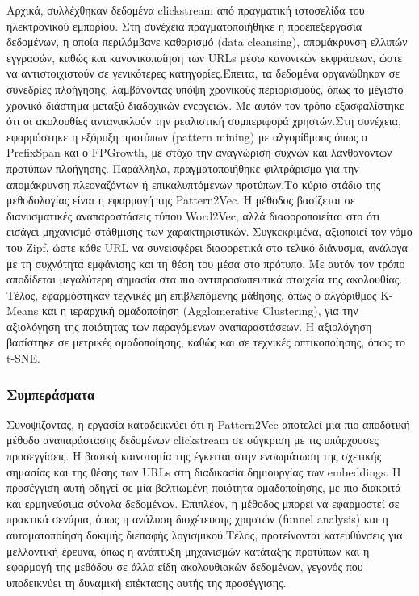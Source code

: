 \documentclass[12pt,a4paper]{article}
\begin{document}
	  Αρχικά, συλλέχθηκαν δεδομένα clickstream από πραγματική ιστοσελίδα του ηλεκτρονικού εμπορίου. Στη συνέχεια πραγματοποιήθηκε η προεπεξεργασία δεδομένων, η οποία περιλάμβανε καθαρισμό (data cleansing), απομάκρυνση ελλιπών εγγραφών, καθώς και κανονικοποίηση των URLs μέσω κανονικών εκφράσεων, ώστε να αντιστοιχιστούν σε γενικότερες κατηγορίες.Έπειτα, τα δεδομένα οργανώθηκαν σε συνεδρίες πλοήγησης, λαμβάνοντας υπόψη χρονικούς περιορισμούς, όπως το μέγιστο χρονικό διάστημα μεταξύ διαδοχικών ενεργειών. Με αυτόν τον τρόπο εξασφαλίστηκε ότι οι ακολουθίες αντανακλούν την ρεαλιστική συμπεριφορά χρηστών.Στη συνέχεια, εφαρμόστηκε η εξόρυξη προτύπων (pattern mining) με αλγορίθμους όπως ο PrefixSpan και ο FPGrowth, με στόχο την αναγνώριση συχνών και λανθανόντων προτύπων πλοήγησης. Παράλληλα, πραγματοποιήθηκε φιλτράρισμα για την απομάκρυνση πλεοναζόντων ή επικαλυπτόμενων προτύπων.Το κύριο στάδιο της μεθοδολογίας είναι η εφαρμογή της Pattern2Vec. Η μέθοδος βασίζεται σε διανυσματικές αναπαραστάσεις τύπου Word2Vec, αλλά διαφοροποιείται στο ότι εισάγει μηχανισμό στάθμισης των χαρακτηριστικών. Συγκεκριμένα, αξιοποιεί τον νόμο του Zipf, ώστε κάθε URL να συνεισφέρει διαφορετικά στο τελικό διάνυσμα, ανάλογα με τη συχνότητα εμφάνισης και τη θέση του μέσα στο πρότυπο. Με αυτόν τον τρόπο αποδίδεται μεγαλύτερη σημασία στα πιο αντιπροσωπευτικά στοιχεία της ακολουθίας. Τέλος, εφαρμόστηκαν τεχνικές μη επιβλεπόμενης μάθησης, όπως ο αλγόριθμος K-Means και η ιεραρχική ομαδοποίηση (Agglomerative Clustering), για την αξιολόγηση της ποιότητας των παραγόμενων αναπαραστάσεων. Η αξιολόγηση βασίστηκε σε μετρικές ομαδοποίησης, καθώς και σε τεχνικές οπτικοποίησης, όπως το t-SNE.
	  
	  \subsubsection{Συμπεράσματα}
	   
	  Συνοψίζοντας, η εργασία καταδεικνύει ότι η Pattern2Vec αποτελεί μια πιο αποδοτική μέθοδο αναπαράστασης δεδομένων clickstream σε σύγκριση με τις υπάρχουσες προσεγγίσεις. Η βασική καινοτομία της έγκειται στην ενσωμάτωση της σχετικής σημασίας και της θέσης των URLs στη διαδικασία δημιουργίας των embeddings. Η προσέγγιση αυτή οδηγεί σε μία βελτιωμένη ποιότητα ομαδοποίησης, με πιο διακριτά και ερμηνεύσιμα σύνολα δεδομένων. Επιπλέον, η μέθοδος μπορεί να εφαρμοστεί σε πρακτικά σενάρια, όπως η ανάλυση διοχέτευσης χρηστών (funnel analysis) και η αυτοματοποίηση δοκιμής διεπαφής λογισμικού.Τέλος, προτείνονται κατευθύνσεις για μελλοντική έρευνα, όπως η ανάπτυξη μηχανισμών κατάταξης προτύπων και η εφαρμογή της μεθόδου σε άλλα είδη ακολουθιακών δεδομένων, γεγονός που υποδεικνύει τη δυναμική επέκτασης αυτής της προσέγγισης.
	
\end{document}
